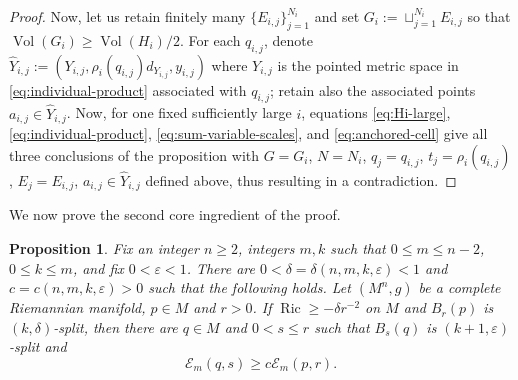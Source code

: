 \documentclass[11pt]{amsart}
\newtheorem{proposition}[theorem]{Proposition}
\theoremstyle{definition}
\theoremstyle{remark}
\DeclareMathOperator{\Ric}{Ric}
\DeclareMathOperator{\Vol}{Vol}
\newcommand{\eps}{\varepsilon}
\newcommand{\Ex}{\mathcal E}
\begin{document}
\begin{proof}
Now, let us retain
finitely many $\{E_{i,j}\}_{j=1}^{N_i}$ and set $G_i:=\sqcup_{j=1}^{N_i} E_{i,j}$ so that $\Vol(G_i)\geq \Vol(H_i)/2$. For each $q_{i,j}$, denote $\widehat Y_{i,j}:=(Y_{i,j},\rho_i(q_{i,j})d_{Y_{i,j}},y_{i,j})$ where $Y_{i,j}$ is the pointed metric space in \eqref{eq:individual-product} associated with $q_{i,j}$; retain also the associated points $a_{i,j}\in \widehat Y_{i,j}$. Now, for one fixed sufficiently large $i$, equations
\eqref{eq:Hi-large}, \eqref{eq:individual-product},
\eqref{eq:sum-variable-scales}, and \eqref{eq:anchored-cell} give
all three conclusions of the proposition with $G=G_i$, $N=N_i$, $q_j=q_{i,j}$, $t_{j}=\rho_i(q_{i,j})$, $E_j=E_{i,j}$, $a_{i,j}\in \widehat Y_{i,j}$ defined above, thus resulting in a contradiction.
\end{proof}

We now prove the second core ingredient of the proof. 

\begin{proposition}
\label{prop:rank-improvement}
Fix an integer $n\geq2$, integers $m,k$ such that $0\leq m\leq n-2$, $0\leq k\leq m$, and fix
$0<\eps<1$.  There are
$0<\delta=\delta(n,m,k,\eps)<1$ and
$c=c(n,m,k,\eps)>0$ such that the following holds. Let $(M^n,g)$ be a complete Riemannian manifold, $p\in M$ and $r>0$. If
$\Ric\geq -\delta r^{-2}$ on $M$ and $B_r(p)$ is $(k,\delta)$-split, then there are
$q\in M$ and $0<s\leq r$ such that $B_s(q)$ is
$(k+1,\eps)$-split and
\begin{equation}\label{eq:rank-volume}
                        \Ex_m(q,s)\geq c\Ex_m(p,r).
\end{equation}
\end{proposition}
\end{document}
